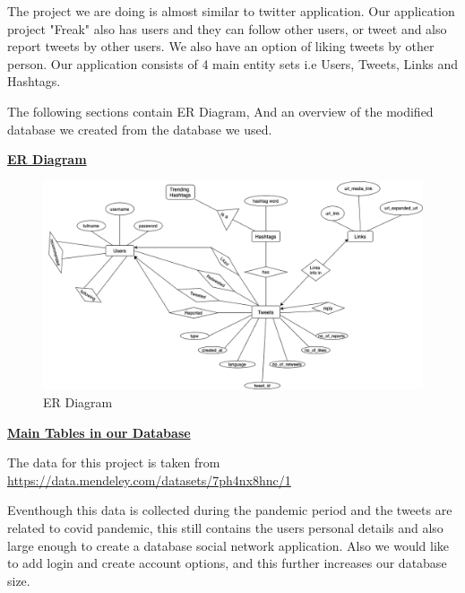 \documentclass{uofa-eng-assignment}
\begin{document}
\maketitle

\noindent The project we are doing is almost similar to twitter application. Our application project "Freak" also has users and they can follow other users, or tweet and also report tweets by other users. We also have an option of liking tweets by other person. Our application consists of 4 main entity sets i.e Users, Tweets, Links and Hashtags.  

\noindent The following sections contain ER Diagram, And an overview of the modified database we created from the database we used.

\begin{center}
    \underline{\textbf{ER Diagram}}
\end{center}


        \begin{figure}[h]
        \begin{center}
            \includegraphics[scale=0.45]{erdiag.png}
            \caption{ER Diagram}
        \end{center}
        \end{figure}

\clearpage

\begin{center}
    \underline{\textbf{Main Tables in our Database}}
\end{center}

\noindent The data for this project is taken from \href{https://data.mendeley.com/datasets/7ph4nx8hnc/1}{https://data.mendeley.com/datasets/7ph4nx8hnc/1}

\noindent Eventhough this data is collected during the pandemic period and the tweets are related to covid pandemic, this still contains the users personal details and also large enough to create a database social network application. Also we would like to add login and create account options, and this further increases our database size.
\end{document}
